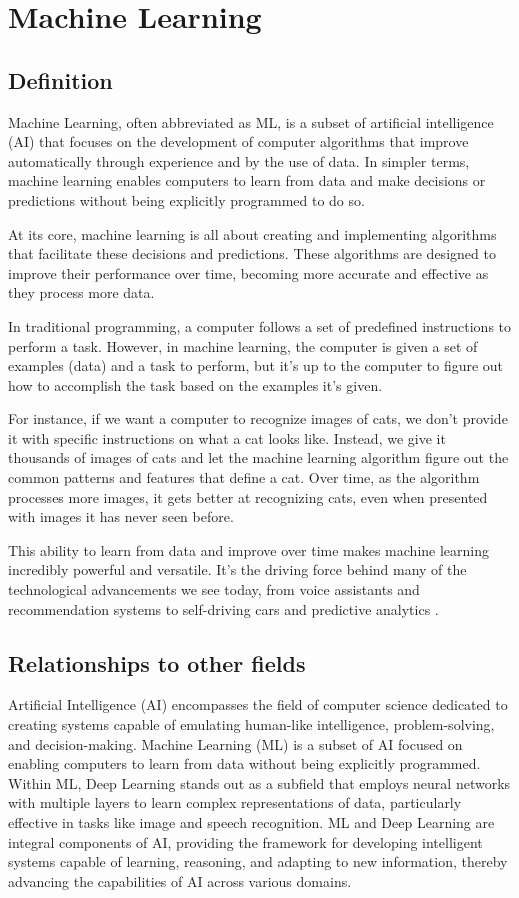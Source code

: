 \section{Machine Learning}

\subsection{Definition}


Machine Learning, often abbreviated as ML, is a subset of artificial intelligence (AI) that focuses on the development of computer algorithms that improve automatically through experience and by the use of data. In simpler terms, machine learning enables computers to learn from data and make decisions or predictions without being explicitly programmed to do so.

At its core, machine learning is all about creating and implementing algorithms that facilitate these decisions and predictions. These algorithms are designed to improve their performance over time, becoming more accurate and effective as they process more data.

In traditional programming, a computer follows a set of predefined instructions to perform a task. However, in machine learning, the computer is given a set of examples (data) and a task to perform, but it's up to the computer to figure out how to accomplish the task based on the examples it's given.

For instance, if we want a computer to recognize images of cats, we don't provide it with specific instructions on what a cat looks like. Instead, we give it thousands of images of cats and let the machine learning algorithm figure out the common patterns and features that define a cat. Over time, as the algorithm processes more images, it gets better at recognizing cats, even when presented with images it has never seen before.

This ability to learn from data and improve over time makes machine learning incredibly powerful and versatile. It's the driving force behind many of the technological advancements we see today, from voice assistants and recommendation systems to self-driving cars and predictive analytics \cite{datacamp:ml}.

\subsection{Relationships to other fields}

Artificial Intelligence (AI) encompasses the field of computer science dedicated to creating systems capable of emulating human-like intelligence, problem-solving, and decision-making. Machine Learning (ML) is a subset of AI focused on enabling computers to learn from data without being explicitly programmed. Within ML, Deep Learning stands out as a subfield that employs neural networks with multiple layers to learn complex representations of data, particularly effective in tasks like image and speech recognition. ML and Deep Learning are integral components of AI, providing the framework for developing intelligent systems capable of learning, reasoning, and adapting to new information, thereby advancing the capabilities of AI across various domains.

